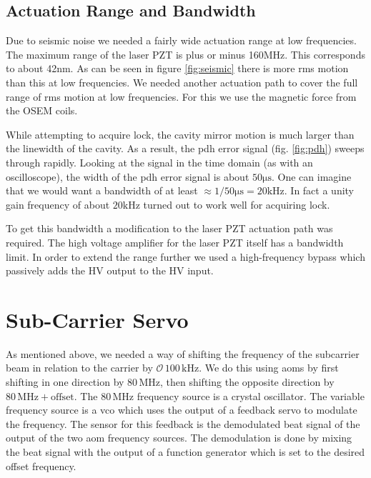 
\subsection{Actuation Range and Bandwidth}
Due to seismic noise we needed a fairly wide actuation range at low frequencies.
The maximum range of the laser PZT is plus or minus 160MHz.
This corresponds to about 42nm.
As can be seen in figure \ref{fig:seismic} there is more rms motion than this
at low frequencies.
We needed another actuation path to cover the full range of rms motion at low
frequencies.
For this we use the magnetic force from the OSEM coils.

While attempting to acquire lock, the cavity mirror motion is much larger than
the linewidth of the cavity.
As a result, the \ac{pdh} error signal (fig. \ref{fig:pdh}) sweeps through
rapidly.
Looking at the signal in the time domain (as with an oscilloscope), the
width of the \ac{pdh} error signal is about $50\mathrm{\mu s}$.
One can imagine that we would want a bandwidth of at least
$\approx 1/50\mathrm{\mu s} = 20\mathrm{kHz}$.
In fact a unity gain frequency of about $20\mathrm{kHz}$ turned out to work
well for acquiring lock.

To get this bandwidth a modification to the laser PZT actuation path was
required.
The high voltage amplifier for the laser PZT itself has a bandwidth limit.
In order to extend the range further we used a high-frequency
bypass which passively adds the HV output to the HV input.


\section{Sub-Carrier Servo}
As mentioned above, we needed a way of shifting the frequency of the subcarrier
beam in relation to the carrier by $\mathcal{O}\, 100\,\mathrm{kHz}$.
We do this using \ac{aom}s by first shifting in one direction by
$80\,\mathrm{MHz}$, then shifting the opposite direction by
$80\,\mathrm{MHz} + \mathrm{offset}$.
The $80\,\mathrm{MHz}$ frequency source is a crystal oscillator.
The variable frequency source is a \ac{vco} which uses the output of a feedback
servo to modulate the frequency.
The sensor for this feedback is the demodulated beat signal of the output of
the two \ac{aom} frequency sources.
The demodulation is done by mixing the beat signal with the output of a
function generator which is set to the desired offset frequency.

